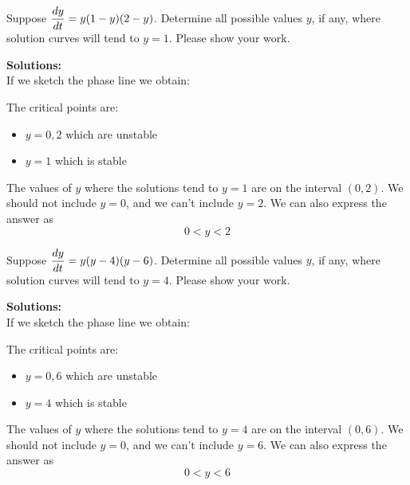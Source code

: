 \ifnum {}
\question[2] Suppose $\displaystyle {\frac{dy}{dt}} = y(1-y)(2-y)$. Determine all possible values $y$, if any, where solution curves will tend to $y=1$. Please show your work. 

\ifnum {} {\color{DarkGreen} 
\textbf{Solutions:} \\
If we sketch the phase line we obtain:

\begin{center}
\end{center}

The critical points are:
\begin{itemize}
    \item $y=0,2$ which are unstable
    \item $y=1$ which is stable
\end{itemize}
The values of $y$ where the solutions tend to $y=1$ are on the interval $(0,2)$. We should not include $y=0$, and we can't include $y=2$. We can also express the answer as
$$0 < y < 2$$
} 
\else 
\vspace{6cm}
\fi\fi 

\ifnum {}
\question[2] Suppose $\displaystyle {\frac{dy}{dt}} = y(y-4)(y-6)$. Determine all possible values $y$, if any, where solution curves will tend to $y=4$. Please show your work. 

\ifnum {} {\color{DarkGreen} 
\textbf{Solutions:} \\
If we sketch the phase line we obtain:

\begin{center}
\end{center}

The critical points are:
\begin{itemize}
    \item $y=0,6$ which are unstable
    \item $y=4$ which is stable
\end{itemize}
The values of $y$ where the solutions tend to $y=4$ are on the interval $(0,6)$. We should not include $y=0$, and we can't include $y=6$. We can also express the answer as
$$0 < y < 6$$
} 
\else 
\vspace{6cm}
\fi\fi 

